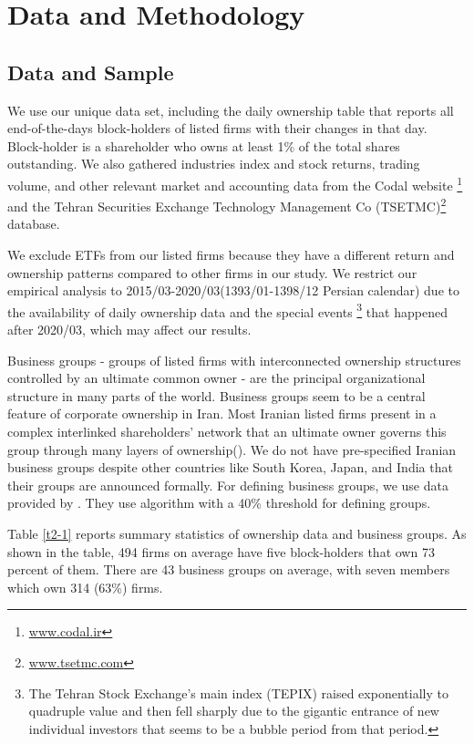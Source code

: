 
\section{{Data and Methodology}}



\subsection{{Data and Sample}}


We  use our unique data set, including the daily ownership table that reports all end-of-the-days block-holders of listed firms with their changes in that day.  Block-holder is a shareholder who owns at least 1\% of the total shares outstanding. 
	We also gathered industries index and stock returns, trading volume, and other relevant market and accounting data from the Codal website \footnote{\href{http://www.codal.ir}{www.codal.ir}}
and the  Tehran Securities Exchange Technology Management Co (TSETMC)\footnote{\href{http://www.tsetmc.com}{www.tsetmc.com}} database.

We exclude ETFs from our listed firms because they have a different return and ownership patterns compared to other firms in our study.
We restrict our empirical analysis to 2015/03-2020/03(1393/01-1398/12 Persian calendar) due to the availability of daily ownership data and the special events \footnote{
	The Tehran Stock Exchange's main index (TEPIX) raised exponentially to quadruple value and then fell sharply due to the gigantic entrance of new individual investors that seems to be a bubble period from that period.} that happened after 2020/03, which may affect our results. 

Business groups - groups of listed firms with interconnected ownership structures controlled by an ultimate common owner - are the principal organizational structure in many parts of the world.
Business groups seem to be a central feature of corporate ownership in Iran. 
Most Iranian listed firms present in a complex interlinked shareholders' network that an ultimate owner governs this group through many layers of ownership({\cite{Aliabadi2022}}).  
We do not have pre-specified Iranian business groups despite other countries like South Korea, Japan, and India that their groups are announced formally.
For defining business groups, we use data provided by {\cite{Aliabadi2022}}.
They use \cite{almeida2011structure} algorithm with a 40\% threshold for defining groups. 


Table \ref{t2-1} reports summary statistics of ownership data and business groups. As shown in the table, 494 firms on average have five block-holders that own 73 percent of them. There are 43 business groups on average, with seven members which own 314 (63\%) firms. 

